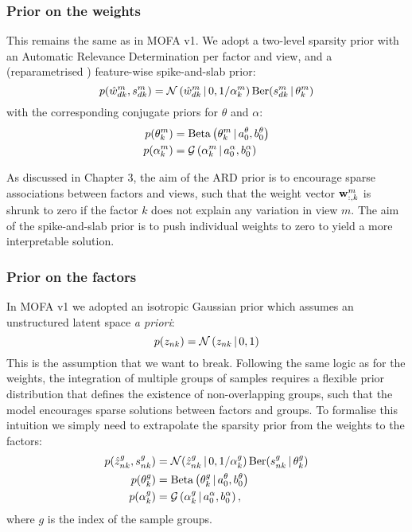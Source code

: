 \subsubsection{Prior on the weights}

This remains the same as in MOFA v1. We adopt a two-level sparsity prior with an Automatic Relevance Determination per factor and view, and a (reparametrised \cite{Titsias2011}) feature-wise spike-and-slab prior:
\begin{equation}
	p(\hat{w}_{dk}^m,s_{dk}^m) = \mathcal{N}\left(\hat{w}_{dk}^{m} \,|\, 0, 1/\alpha_{k}^{m}\right)  \text{Ber}(s_{dk}^{m} \,|\,\theta_{k}^{m})
\end{equation}
with the corresponding conjugate priors for $\theta$ and $\alpha$:
\begin{align}
	p(\theta_k^m) &= \text{Beta}\left(\theta_k^m \,|\, a_0^\theta,b_0^\theta\right)\\
	p(\alpha_k^m) &= \mathcal{G}\left(\alpha_k^m \,|\, a_0^\alpha, b_0^\alpha\right)
\end{align}

As discussed in Chapter 3, the aim of the ARD prior is to encourage sparse associations between factors and views, such that the weight vector ${\bf w}_{:,k}^m$ is shrunk to zero if the factor $k$ does not explain any variation in view $m$. The aim of the spike-and-slab prior is to push individual weights to zero to yield a more interpretable solution.

\subsubsection{Prior on the factors}

In MOFA v1 we adopted an isotropic Gaussian prior which assumes an unstructured latent space \textit{a priori}:
\begin{equation}
	p(z_{nk}) = \mathcal{N}\left(z_{nk} \,|\, 0,1\right)
\end{equation}
This is the assumption that we want to break. Following the same logic as for the weights, the integration of multiple groups of samples requires a flexible prior distribution that defines the existence of non-overlapping groups, such that the model encourages sparse solutions between factors and groups. To formalise this intuition we simply need to extrapolate the sparsity prior from the weights to the factors:
\begin{align}
	p(\hat{z}_{nk}^g,s_{nk}^g) &= \mathcal{N} (\hat{z}_{nk}^g \,|\, 0, 1/\alpha_k^g)\, \text{Ber}(s_{nk}^g \,|\,\theta_k^g) \\
	p(\theta_k^g) &= \text{Beta}\left(\theta_k^g \,|\, a_0^\theta,b_0^\theta\right) \\
	p(\alpha_k^g) &= \mathcal{G}\left(\alpha_k^g \,|\, a_0^\alpha, b_0^\alpha\right),
\end{align}
where $g$ is the index of the sample groups.

